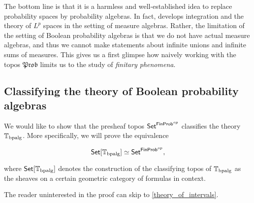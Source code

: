 \documentclass[a4paper]{amsproc}
\theoremstyle{plain}
\theoremstyle{definition}
\theoremstyle{remark}
\numberwithin{equation}{section}
\newcommand{\Set}{\textup{\textsf{Set}}}
\newcommand{\FinProb}{\textup{\textsf{FinProb}}}
\newcommand{\Prob}{\mathfrak{Prob}}
\begin{document}
The bottom line is that it is a harmless and well-established idea to replace probability spaces by probability algebras. In fact, \cite{fremlin2012measure} develops integration and the theory of $L^p$ spaces in the setting of measure algebras. Rather, the limitation of the setting of Boolean probability algebras is that we do not have actual measure algebras, and thus we cannot make statements about infinite unions and infinite sums of measures. This gives us a first glimpse how naively working with the topos $\Prob$ limits us to the study of \emph{finitary phenomena}.

\subsection{Classifying the theory of Boolean probability algebras}

We would like to show that the presheaf topos \newline $\Set^{\FinProb^{op}}$ classifies the theory $\mathbb{T}_{\textup{bpalg}}$. More specifically, we will prove the equivalence

\begin{equation}\label{equiv}
    \Set[\mathbb{T}_{\textup{bpalg}}] \simeq \Set^{\FinProb^{op}} ,
\end{equation}

where $\Set[\mathbb{T}_{\textup{bpalg}}]$ denotes the construction of the classifying topos of $\mathbb{T}_{\textup{bpalg}}$ as the sheaves on a certain geometric category of formulas in context.

The reader uninterested in the proof can skip to \ref{theory_of_intervals}.
\end{document}
